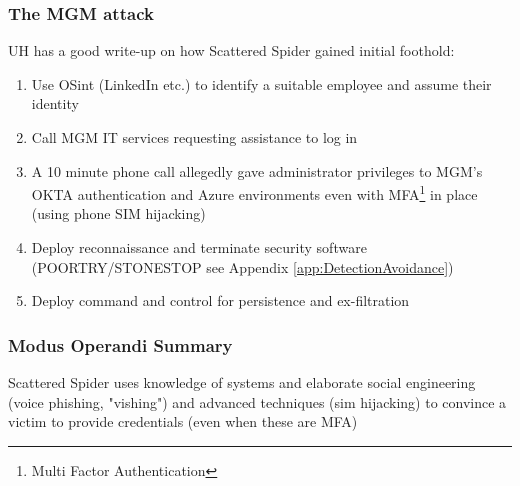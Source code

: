 \documentclass[
	letterpaper, %
	10pt, %
	unnumberedsections, %
	twoside, %
]{APAAssignment}
\begin{document}
\subsubsection{The MGM attack} UH\cite{UHonMGM-ALPHV} has a good write-up on how Scattered Spider gained initial foothold:

\begin{enumerate}
	\item Use OSint (LinkedIn etc.) to identify a suitable employee and assume their identity
	\item Call MGM IT services requesting assistance to log in
	\item A 10 minute phone call allegedly gave administrator privileges to MGM's OKTA authentication and Azure environments even with MFA\footnote{Multi Factor Authentication} in place (using phone SIM hijacking)
	\item Deploy reconnaissance and terminate security software (POORTRY/STONESTOP see Appendix \ref{app:DetectionAvoidance})\cite{TrellixScattetedSpider}
	\item Deploy command and control for persistence and ex-filtration
\end{enumerate}

\subsubsection{Modus Operandi Summary} Scattered Spider uses knowledge of systems and elaborate social engineering (voice phishing, "vishing") and advanced techniques  (sim hijacking) to convince a victim to provide credentials (even when these are MFA)
\end{document}
